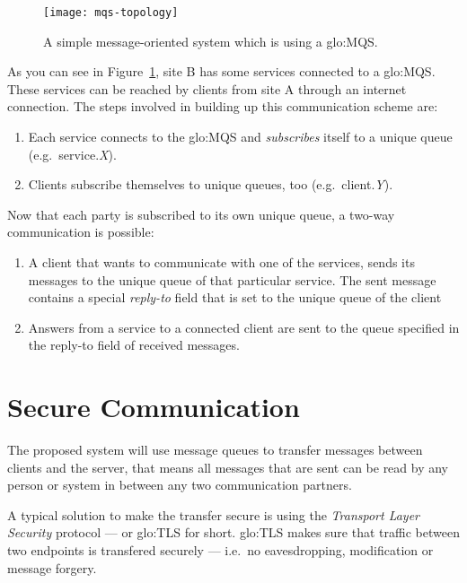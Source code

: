 \begin{figure}[htbp]
  \centering
  \texttt{[image: mqs-topology]}
  \caption[Example MQS topology]{A simple message-oriented system which is
    using a \gls{glo:MQS}.}
  \label{fig:mqs-topology}
\end{figure}

As you can see in  Figure~\ref{fig:mqs-topology}, site B has some services
connected to  a \gls{glo:MQS}.  These services can  be reached  by clients
from site A through an internet connection. The steps involved in building
up this communication scheme are:
\begin{enumerate}
\item  Each service  connects to  the \gls{glo:MQS}  and \emph{subscribes}
  itself to a unique queue (e.g.~service.\emph{X}).
\item    Clients   subscribe    themselves   to    unique    queues,   too
  (e.g.~client.\emph{Y}).
\end{enumerate}

Now  that each  party is  subscribed to  its own  unique queue,  a two-way
communication is possible:
\begin{enumerate}
\item A client  that wants to communicate with one  of the services, sends
  its messages  to the unique queue  of that particular  service. The sent
  message  contains a  special \emph{reply-to}  field that  is set  to the
  unique queue of the client
\item Answers from  a service to a connected client are  sent to the queue
  specified in the reply-to field of received messages.
\end{enumerate}

\section{Secure Communication}
\label{sec:secure-communication}

The proposed system  will use message queues to  transfer messages between
clients and the server, that means  all messages that are sent can be read
by any person or system in between any two communication partners. 

A   typical  solution   to  make   the  transfer   secure  is   using  the
\emph{Transport Layer  Security} protocol --- or  \gls{glo:TLS} for short.
\gls{glo:TLS} makes sure that  traffic between two endpoints is transfered
securely --- i.e.~no eavesdropping, modification or message forgery.


